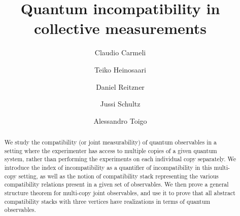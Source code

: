 \documentclass[12pt]{amsart}
\theoremstyle{definition}
\begin{document}
\title{Quantum incompatibility in collective measurements}





\begin{abstract}{We study the compatibility (or joint measurability) of quantum observables in a setting where the experimenter has access to multiple copies of a given quantum system, rather than performing the experiments on each individual copy separately. We introduce the index of incompatibility as a quantifier of incompatibility in this multi-copy setting, as well as the notion of compatibility stack representing the various compatibility relations present in a given set of observables. We then prove a general structure theorem for multi-copy joint observables, and use it to prove that all abstract compatibility stacks with three  vertices have realizations in terms of quantum observables. }
\end{abstract}



\author[Carmeli]{Claudio Carmeli}
\address{\textbf{Claudio Carmeli}; DIME, Universit\`a di Genova, Via Magliotto 2, I-17100 Savona, Italy}


\author[Heinosaari]{Teiko Heinosaari}
\address{\textbf{Teiko Heinosaari}; Turku Centre for Quantum Physics, Department of Physics and Astronomy, University of Turku, Finland}

\author[Reitzner]{Daniel Reitzner}
\address{\textbf{Daniel Reitzner}; Institute of Physics, Slovak Academy of Sciences, D\'ubravsk\'a cesta 9, 845 11 Bratislava, Slovakia}

\author[Schultz]{Jussi Schultz}
\address{\textbf{Jussi Schultz}; Turku Centre for Quantum Physics, Department of Physics and Astronomy, University of Turku, Finland}

\author[Toigo]{Alessandro Toigo}
\address{\textbf{Alessandro Toigo}; Dipartimento di Matematica, Politecnico di Milano, Piazza Leonardo da Vinci 32, I-20133 Milano, Italy, and I.N.F.N., Sezione di Milano, Via Celoria 16, I-20133 Milano, Italy}



\maketitle
\end{document}
